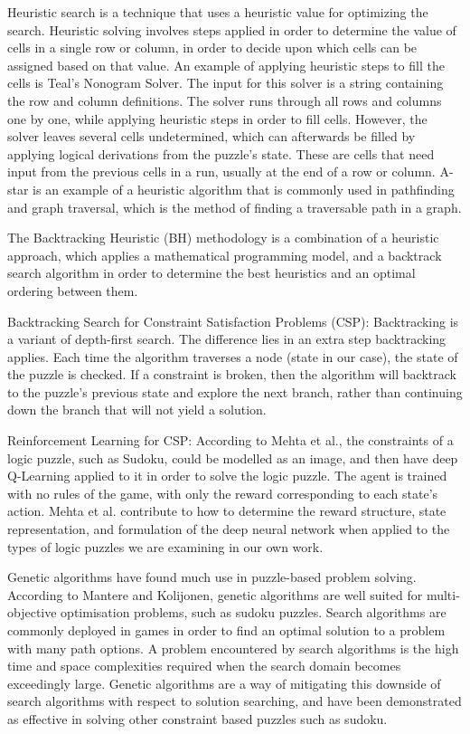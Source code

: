 \documentclass{svproc}
\begin{document}
Heuristic search is a technique that uses a heuristic value for optimizing the search.
Heuristic solving involves steps applied in order to determine the value of cells in a single row or column\cite{Salcedo}, in order to decide upon which cells can be assigned based on that value\cite{CHYU}.
An example of applying heuristic steps to fill the cells is Teal’s Nonogram Solver\cite{Teal}.
The input for this solver is a string containing the row and column definitions.
The solver runs through all rows and columns one by one, while applying heuristic steps in order to fill cells.
However, the solver leaves several cells undetermined, which can afterwards be filled by applying logical derivations from the puzzle's state.
These are cells that need input from the previous cells in a run, usually at the end of a row or column.
A-star is an example of a heuristic algorithm that is commonly used in pathfinding and graph traversal, which is the method of finding a traversable path in a graph\cite{astar}.

The Backtracking Heuristic (BH) methodology is a combination of a heuristic approach, which applies a mathematical programming model, and a backtrack search algorithm in order to determine the best heuristics and an optimal ordering between them\cite{BH}.

Backtracking Search for Constraint Satisfaction Problems (CSP): Backtracking is a variant of depth-first search.
The difference lies in an extra step backtracking applies.
Each time the algorithm traverses a node (state in our case), the state of the puzzle is checked.
If a constraint is broken, then the algorithm will backtrack to the puzzle's previous state and explore the next branch, rather than continuing down the branch that will not yield a solution.

Reinforcement Learning for CSP: According to Mehta et al.\cite{Qlearning}, the constraints of a logic puzzle, such as Sudoku, could be modelled as an image, and then have deep Q-Learning applied to it in order to solve the logic puzzle.
The agent is trained with no rules of the game, with only the reward corresponding to each state's action.
Mehta et al. contribute to how to determine the reward structure, state representation, and formulation of the deep neural network when applied to the types of logic puzzles we are examining in our own work.

Genetic algorithms have found much use in puzzle-based problem solving.
According to Mantere and Kolijonen\cite{geneticAlgo}, genetic algorithms are well suited for multi-objective optimisation problems, such as sudoku puzzles.
Search algorithms are commonly deployed in games in order to find an optimal solution to a problem with many path options.
A problem encountered by search algorithms is the high time and space complexities required when the search domain becomes exceedingly large.
Genetic algorithms are a way of mitigating this downside of search algorithms with respect to solution searching, and have been demonstrated as effective in solving other constraint based puzzles such as sudoku.
\end{document}
